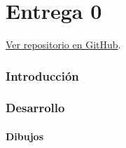 \documentclass{article}
\begin{document}
\newpage
\thispagestyle{empty} %
\tableofcontents
\thispagestyle{plain} %
\thispagestyle{empty} %
\newpage

\newpage
\thispagestyle{empty}
\listoffigures 
\thispagestyle{plain} %
\thispagestyle{empty}
\newpage
\setcounter{page}{1}
\part{Entrega 0}
\begin{center}
  \href{https://github.com/LukasWolff2002/PROYECTO_1_MCOCo}{Ver repositorio en GitHub}.
\end{center}

\section{Introducción}

\section{Desarrollo}

\subsection{Dibujos}
\end{document}
